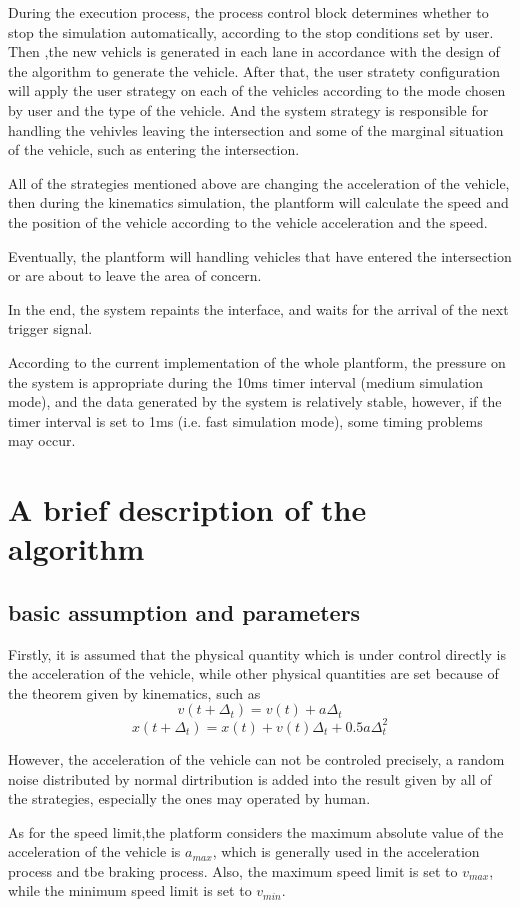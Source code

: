 \documentclass[a4paper]{paper}
\begin{document}
During the execution process, the process control block determines whether to stop the simulation automatically, according to the stop conditions set by user. Then ,the new vehicls is generated in each lane in accordance with the design of the algorithm to generate the vehicle. After that, the user stratety configuration will apply the user strategy on each of the vehicles according to the mode chosen by user and the type of the vehicle. And the system strategy is responsible for handling the vehivles leaving the intersection and some of the marginal situation of the vehicle, such as entering the intersection. 

All of the strategies mentioned above are changing the acceleration of the vehicle, then during the kinematics simulation, the plantform will calculate the speed and the position of the vehicle according to the vehicle acceleration and the speed.

Eventually, the plantform will handling vehicles that have entered the intersection or are about to leave the area of concern.

In the end, the system repaints the interface, and waits for the arrival of the next trigger signal.

According to the current implementation of the whole plantform, the pressure on the system is appropriate during the 10ms timer interval (medium simulation mode), and the data generated by the system is relatively stable, however, if the timer interval is set to 1ms (i.e. fast simulation mode), some timing problems may occur.
\section{A brief description of the algorithm}
\subsection{basic assumption and parameters}
Firstly, it is assumed that the physical quantity which is under control directly is the acceleration of the vehicle, while other physical quantities are set because of the theorem given by kinematics, such as 
$$v(t+\Delta_t)=v(t)+a\Delta_t$$
$$x(t+\Delta_t)=x(t)+v(t)\Delta_t+0.5a\Delta_t^2$$ 

However, the acceleration of the vehicle can not be controled precisely, a random noise distributed by normal dirtribution is added into the result given by all of the strategies, especially the ones may operated by human.

As for the speed limit,the platform considers the maximum absolute value of the acceleration of the vehicle is $a_{max}$, which is generally used in the acceleration process and tbe braking process. Also, the maximum speed limit is set to $v_{max}$, while the minimum speed limit is set to $v_{min}$.
\end{document}
